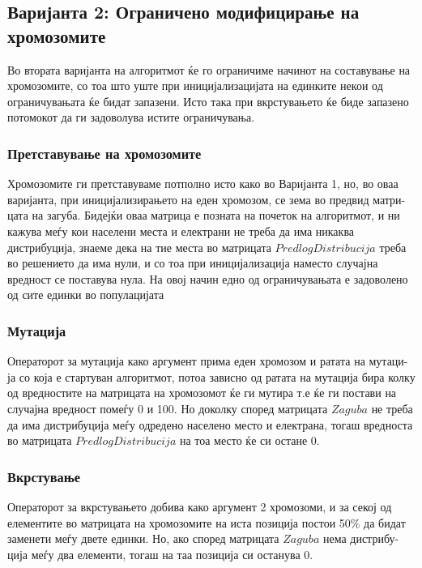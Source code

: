 \documentclass{article}
\begin{document}
\subsection{Варијанта 2: Ограничено модифицирање на хромозомите}

Во втората варијанта на алгоритмот ќе го ограничиме начинот на составување на хромозомите, со тоа што уште при иницијализацијата на единките некои од ограничувањата ќе бидат запазени. Исто така при вкрстувањето ќе биде запазено потомокот да ги задоволува истите ограничувања.

\subsubsection{Претставување на хромозомите}

Хромозомите ги претставуваме потполно исто како во Варијанта 1, но, во оваа варијанта, при иницијализирањето на еден хромозом, се зема во предвид матри-цата на загуба. Бидејќи оваа матрица е позната на почеток на алгоритмот, и ни кажува меѓу кои населени места и електрани не треба да има никаква дистрибуција, знаеме дека на тие места во матрицата $PredlogDistribucija$ треба во решението да има нули, и со тоа при иницијализација наместо случајна вредност се поставува нула. На овој начин едно од ограничувањата е задоволено од сите единки во популацијата

\subsubsection{Мутација}

Операторот за мутација како аргумент прима еден хромозом и ратата на мутаци-ја со која е стартуван алгоритмот, потоа зависно од ратата на мутација бира колку од вредностите на матрицата на хромозомот ќе ги мутира т.е ќе ги постави на случајна вредност помеѓу 0 и 100. Но доколку според матрицата $Zaguba$ не треба да има дистрибуција меѓу одредено населено место и електрана, тогаш вредноста во матрицата $PredlogDistribucija$ на тоа место ќе си остане 0.
 
\subsubsection{Вкрстување}

Операторот за вкрстувањето добива како аргумент 2 хромозоми, и за секој од елементите во матрицата на хромозомите на иста позиција постои 50\% да бидат заменети меѓу двете единки. Но, ако според матрицата $Zaguba$ нема дистрибу-ција меѓу два елементи, тогаш на таа позиција си останува 0.
 
\end{document}
